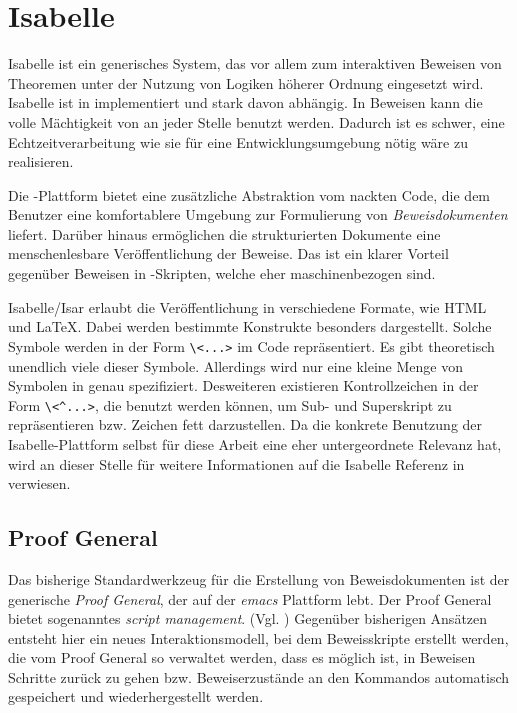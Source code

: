 \section{Isabelle}

Isabelle ist ein generisches System, das vor allem zum interaktiven Beweisen von Theoremen unter
der Nutzung von Logiken höherer Ordnung eingesetzt wird. Isabelle ist in  implementiert und
stark davon abhängig. In Beweisen kann die volle Mächtigkeit von  an jeder Stelle benutzt
werden. Dadurch ist es schwer, eine Echtzeitverarbeitung wie sie für eine Entwicklungsumgebung nötig
wäre zu realisieren.

Die -Plattform bietet eine zusätzliche Abstraktion vom nackten  Code, die dem
Benutzer eine komfortablere Umgebung zur Formulierung von \textit{Beweisdokumenten} liefert. Darüber
hinaus ermöglichen die strukturierten Dokumente eine menschenlesbare Veröffentlichung der Beweise.
Das ist ein klarer Vorteil gegenüber Beweisen in -Skripten, welche eher maschinenbezogen
sind.

Isabelle/Isar erlaubt die Veröffentlichung in verschiedene Formate, wie HTML und \LaTeX. Dabei werden
bestimmte Konstrukte besonders dargestellt. Solche Symbole werden in der Form
\texttt{\textbackslash\textless ...\textgreater} im Code repräsentiert. Es gibt theoretisch
unendlich viele dieser Symbole. Allerdings wird nur eine kleine Menge von Symbolen in
\cite{isabelle} genau spezifiziert. Desweiteren existieren Kontrollzeichen in der Form
\texttt{\textbackslash\textless\textasciicircum ...\textgreater}, die benutzt werden können, um
Sub- und Superskript zu repräsentieren bzw. Zeichen fett darzustellen. Da die konkrete Benutzung der
Isabelle-Plattform selbst für diese Arbeit eine eher untergeordnete Relevanz hat, wird an dieser
Stelle für weitere Informationen auf die Isabelle Referenz in \cite{isabelle} verwiesen.

\subsection{Proof General}

Das bisherige Standardwerkzeug für die Erstellung von Beweisdokumenten ist der generische
\textit{Proof General}, der auf der \textit{emacs} Plattform lebt. Der Proof General bietet
sogenanntes \textit{script management}. (Vgl. \cite{sm}) Gegenüber bisherigen Ansätzen entsteht hier
ein neues Interaktionsmodell, bei dem Beweisskripte erstellt werden, die vom Proof General so
verwaltet werden, dass es möglich ist, in Beweisen Schritte zurück zu gehen bzw. Beweiserzustände
an den Kommandos automatisch gespeichert und wiederhergestellt werden. 

